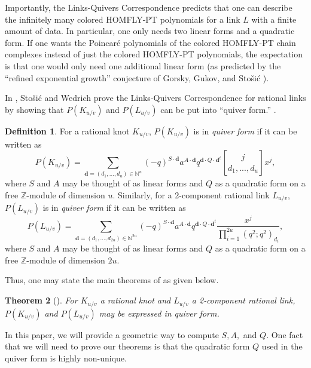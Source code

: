 \documentclass[11pt]{amsart}
\theoremstyle{plain}
\newtheorem{theoremN}{Theorem}[section]
\theoremstyle{definition}
\newtheorem{definitionN}[theoremN]{Definition}
\theoremstyle{remark}
\begin{document}
Importantly, the Links-Quivers Correspondence predicts that one can describe the infinitely many colored HOMFLY-PT polynomials for a link $L$ with a finite amount of data. In particular, one only needs two linear forms and a quadratic form. If one wants the Poincar\'e polynomials of the colored HOMFLY-PT chain complexes instead of just the colored HOMFLY-PT polynomials, the expectation is that one would only need one additional linear form (as predicted by the ``refined exponential growth'' conjecture of Gorsky, Gukov, and Sto\v si\'c \cite{GGS13,GS12}). 

In \cite{SW21}, Sto\v si\'c and Wedrich prove the Links-Quivers Correspondence for rational links by showing that $P(K_{u/v})$ and $P(L_{u/v})$ can be put into ``quiver form.'' . 

\begin{definitionN}
    For a rational knot $K_{u/v}$, $P(K_{u/v})$ is in \textit{quiver form} if it can be written as 
    \begin{equation}
    \label{quivformknot}
        P(K_{u/v})=\sum_{\textbf{d}=(d_1,...,d_u)\in\mathbb{N}^u}(-q)^{S\cdot \textbf{d}}a^{A\cdot \textbf{d}}q^{\textbf{d}\cdot Q\cdot \textbf{d}^t}{j \brack d_1,...,d_u}x^j,
    \end{equation}
    where $S$ and $A$ may be thought of as linear forms and $Q$ as a quadratic form on a free $\mathbb{Z}$-module of dimension $u$. Similarly, for a 2-component rational link $L_{u/v}$, $P(L_{u/v})$ is in \textit{quiver form} if it can be written as 
    \begin{equation}
    \label{quivformlink}
        P(L_{u/v})=\sum_{\textbf{d}=(d_1,...,d_{2u})\in \mathbb{N}^{2u}}(-q)^{S\cdot \textbf{d}}a^{A\cdot \textbf{d}}q^{\textbf{d}\cdot Q\cdot \textbf{d}^t}\frac{x^j}{\prod_{i=1}^{2u}(q^2;q^2)_{d_i}},
    \end{equation}
     where $S$ and $A$ may be thought of as linear forms and $Q$ as a quadratic form on a free $\mathbb{Z}$-module of dimension $2u$.
\end{definitionN}

Thus, one may state the main theorems of \cite{SW21} as given below.

\begin{theoremN}[\cite{SW21}]
    For $K_{u/v}$ a rational knot and $L_{u/v}$ a 2-component rational link, $P(K_{u/v})$ and $P(L_{u/v})$ may be expressed in quiver form.
\end{theoremN}

In this paper, we will provide a geometric way to compute $S,A,$ and $Q$. One fact that we will need to prove our theorems is that the quadratic form $Q$ used in the quiver form is highly non-unique.
\end{document}
